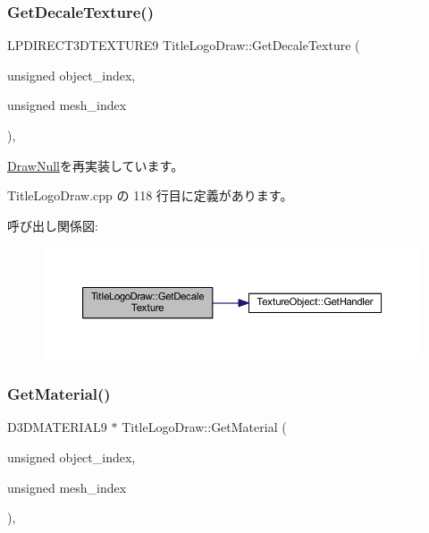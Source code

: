 \subsubsection{\texorpdfstring{Get\+Decale\+Texture()}{GetDecaleTexture()}}
{\footnotesize\ttfamily L\+P\+D\+I\+R\+E\+C\+T3\+D\+T\+E\+X\+T\+U\+R\+E9 Title\+Logo\+Draw\+::\+Get\+Decale\+Texture (\begin{DoxyParamCaption}\item[{unsigned}]{object\+\_\+index,  }\item[{unsigned}]{mesh\+\_\+index }\end{DoxyParamCaption})\hspace{0.3cm}{\ttfamily [override]}, {\ttfamily [virtual]}}



\mbox{\hyperlink{class_draw_null_a8496ed1b1f765a331a8f1704122b8ca4}{Draw\+Null}}を再実装しています。



 Title\+Logo\+Draw.\+cpp の 118 行目に定義があります。

呼び出し関係図\+:\nopagebreak
\begin{figure}[H]
\begin{center}
\leavevmode
\includegraphics[width=350pt]{class_title_logo_draw_ab727012424a02249a90a0f7d247371a8_cgraph}
\end{center}
\end{figure}
\mbox{\label{class_title_logo_draw_a8858aa1b1eb9a6d4cb4605519efb20eb}} 
\subsubsection{\texorpdfstring{Get\+Material()}{GetMaterial()}}
{\footnotesize\ttfamily D3\+D\+M\+A\+T\+E\+R\+I\+A\+L9 $\ast$ Title\+Logo\+Draw\+::\+Get\+Material (\begin{DoxyParamCaption}\item[{unsigned}]{object\+\_\+index,  }\item[{unsigned}]{mesh\+\_\+index }\end{DoxyParamCaption})\hspace{0.3cm}{\ttfamily [override]}, {\ttfamily [virtual]}}



